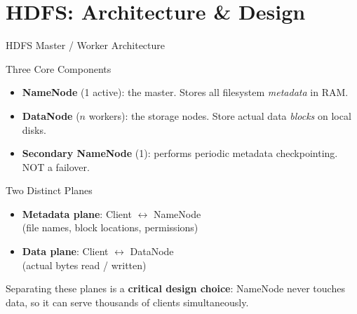 \documentclass[aspectratio=169,10pt]{beamer}
\begin{document}
\section{HDFS: Architecture \& Design}

\begin{frame}{HDFS Master / Worker Architecture}
 
      \begin{block}{Three Core Components}
        \begin{itemize}
          \item \textbf{NameNode} (1 active): the master.  Stores all filesystem \emph{metadata} in RAM.
          \item \textbf{DataNode} ($n$ workers): the storage nodes.  Store actual data \emph{blocks} on local disks.
          \item \textbf{Secondary NameNode} (1): performs periodic metadata checkpointing.  \alert{NOT} a failover.
        \end{itemize}
      \end{block}
      \vspace{4pt}
      \begin{alertblock}{Two Distinct Planes}
        \begin{itemize}
          \item \textbf{Metadata plane}: Client $\leftrightarrow$ NameNode\\(file names, block locations, permissions)
          \item \textbf{Data plane}: Client $\leftrightarrow$ DataNode\\(actual bytes read / written)
        \end{itemize}
        Separating these planes is a \textbf{critical design choice}: NameNode never touches data, so it can serve thousands of clients simultaneously.
      \end{alertblock}

    
\end{frame}
\end{document}
